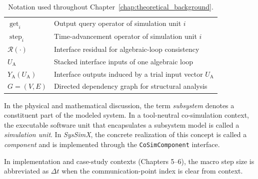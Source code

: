 \begin{table}[htbp]
\begin{tabular}{ll}
        $\operatorname{get}_i$ & Output query operator of simulation unit $i$ \\
        $\operatorname{step}_i$ & Time-advancement operator of simulation unit $i$ \\
        $\mathcal{R}(\cdot)$ & Interface residual for algebraic-loop consistency \\
        $U_\mathrm{A}$ & Stacked interface inputs of one algebraic loop \\
        $Y_\mathrm{A}(U_\mathrm{A})$ & Interface outputs induced by a trial input vector $U_\mathrm{A}$ \\
        $G=(V,E)$ & Directed dependency graph for structural analysis \\
        \bottomrule
    \end{tabular}
    \caption[Notation]{Notation used throughout Chapter~\ref{chap:theoretical_background}.}
    \label{tab:notation}
\end{table}

In the physical and mathematical discussion, the term \emph{subsystem} denotes a constituent part of the modeled system.
In a tool-neutral co-simulation context, the executable software unit that encapsulates a subsystem model is called a \emph{simulation unit}.
In \emph{SysSimX}, the concrete realization of this concept is called a \emph{component} and is implemented through the \texttt{CoSimComponent} interface.

In implementation and case-study contexts (Chapters 5–6), the macro step size is abbreviated as $\Delta t$ when the communication-point index is clear from context.
